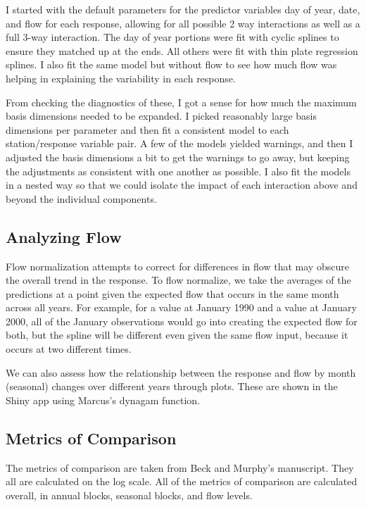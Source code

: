 \documentclass[12pt]{amsart}
\begin{document}
I started with the default parameters for the predictor variables day of year, date, and flow for each response, allowing for all possible 2 way interactions as well as a full 3-way interaction. The day of year portions were fit with cyclic splines to ensure they matched up at the ends. All others were fit with thin plate regression splines. I also fit the same model but without flow to see how much flow was helping in explaining the variability in each response. 

From checking the diagnostics of these, I got a sense for how much the maximum basis dimensions needed to be expanded. I picked reasonably large basis dimensions per parameter and then fit a consistent model to each station/response variable pair. A few of the models yielded warnings, and then I adjusted the basis dimensions a bit to get the warnings to go away, but keeping the adjustments as consistent with one another as possible. I also fit the models in a nested way so that we could isolate the impact of each interaction above and beyond the individual components. 

\subsection{Analyzing Flow }

Flow normalization attempts to correct for differences in flow that may obscure the overall trend in the response. To flow normalize, we take the averages of the predictions at a point given the expected flow that occurs in the same month across all years. For example, for a value at January 1990 and a value at January 2000, all of the January observations would go into creating the expected flow for both, but the spline will be different even given the same flow input, because it occurs at two different times.

We can also assess how the relationship between the response and flow by month (seasonal) changes over different years through plots. These are shown in the Shiny app using Marcus's dynagam function. 








\subsection{Metrics of Comparison}

The metrics of comparison are taken from Beck and Murphy's manuscript. They all are calculated on the log scale.  All of the metrics of comparison are calculated overall, in annual blocks, seasonal blocks, and flow levels. 
\end{document}
